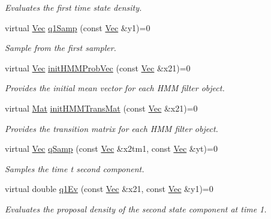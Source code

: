\begin{DoxyCompactItemize}
\begin{DoxyCompactList}\small\item\em Evaluates the first time state density. \end{DoxyCompactList}\item 
virtual \hyperlink{pmfs_8h_a4c7df05c6f5e8a0d15ae14bcdbc07152}{Vec} \hyperlink{classHmm__Rbpf_a1517fdbdf37a4dab6e6c0bca229fd4a0}{q1\+Samp} (const \hyperlink{pmfs_8h_a4c7df05c6f5e8a0d15ae14bcdbc07152}{Vec} \&y1)=0
\begin{DoxyCompactList}\small\item\em Sample from the first sampler. \end{DoxyCompactList}\item 
virtual \hyperlink{pmfs_8h_a4c7df05c6f5e8a0d15ae14bcdbc07152}{Vec} \hyperlink{classHmm__Rbpf_a33ab8bbb1a85fd06fa2d507fa5d48904}{init\+H\+M\+M\+Prob\+Vec} (const \hyperlink{pmfs_8h_a4c7df05c6f5e8a0d15ae14bcdbc07152}{Vec} \&x21)=0
\begin{DoxyCompactList}\small\item\em Provides the initial mean vector for each H\+MM filter object. \end{DoxyCompactList}\item 
virtual \hyperlink{pmfs_8h_ae601f56a556993079f730483c574356f}{Mat} \hyperlink{classHmm__Rbpf_a752c2997aee03219fe3eb4fbe63ed3af}{init\+H\+M\+M\+Trans\+Mat} (const \hyperlink{pmfs_8h_a4c7df05c6f5e8a0d15ae14bcdbc07152}{Vec} \&x21)=0
\begin{DoxyCompactList}\small\item\em Provides the transition matrix for each H\+MM filter object. \end{DoxyCompactList}\item 
virtual \hyperlink{pmfs_8h_a4c7df05c6f5e8a0d15ae14bcdbc07152}{Vec} \hyperlink{classHmm__Rbpf_a3552390cea3b92ce312f4ebd14875f69}{q\+Samp} (const \hyperlink{pmfs_8h_a4c7df05c6f5e8a0d15ae14bcdbc07152}{Vec} \&x2tm1, const \hyperlink{pmfs_8h_a4c7df05c6f5e8a0d15ae14bcdbc07152}{Vec} \&yt)=0
\begin{DoxyCompactList}\small\item\em Samples the time t second component. \end{DoxyCompactList}\item 
virtual double \hyperlink{classHmm__Rbpf_ab09ad68fd6d1b5e614bd772cb5e20a78}{q1\+Ev} (const \hyperlink{pmfs_8h_a4c7df05c6f5e8a0d15ae14bcdbc07152}{Vec} \&x21, const \hyperlink{pmfs_8h_a4c7df05c6f5e8a0d15ae14bcdbc07152}{Vec} \&y1)=0
\begin{DoxyCompactList}\small\item\em Evaluates the proposal density of the second state component at time 1. \end{DoxyCompactList}\item 

\end{DoxyCompactItemize}
